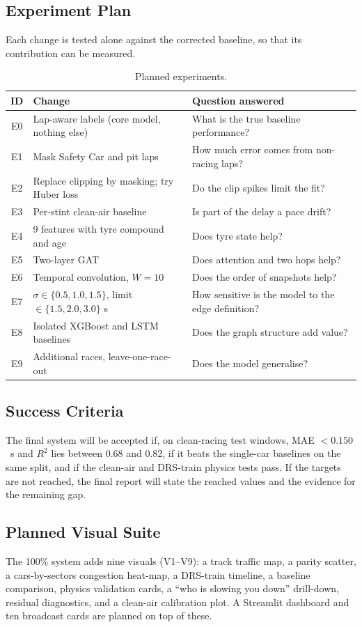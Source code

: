 \documentclass[11pt,a4paper]{article}
\begin{document}
\subsection{Experiment Plan}
Each change is tested alone against the corrected baseline, so that its
contribution can be measured.
\begin{table}[H]
\centering
\caption{Planned experiments.}
\label{tab:experiments}
\small
\begin{tabularx}{\linewidth}{@{}cXX@{}}
\toprule
\textbf{ID} & \textbf{Change} & \textbf{Question answered} \\
\midrule
E0 & Lap-aware labels (core model, nothing else) & What is the true baseline performance? \\
E1 & Mask Safety Car and pit laps & How much error comes from non-racing laps? \\
E2 & Replace clipping by masking; try Huber loss & Do the clip spikes limit the fit? \\
E3 & Per-stint clean-air baseline & Is part of the delay a pace drift? \\
E4 & 9 features with tyre compound and age & Does tyre state help? \\
E5 & Two-layer GAT & Does attention and two hops help? \\
E6 & Temporal convolution, $W=10$ & Does the order of snapshots help? \\
E7 & $\sigma \in \{0.5, 1.0, 1.5\}$, limit $\in \{1.5, 2.0, 3.0\}$ s & How sensitive is the model to the edge definition? \\
E8 & Isolated XGBoost and LSTM baselines & Does the graph structure add value? \\
E9 & Additional races, leave-one-race-out & Does the model generalise? \\
\bottomrule
\end{tabularx}
\end{table}

\subsection{Success Criteria}
The final system will be accepted if, on clean-racing test windows,
MAE $< 0.150$~s and $R^2$ lies between 0.68 and 0.82, if it beats the
single-car baselines on the same split, and if the clean-air and DRS-train
physics tests pass. If the targets are not reached, the final report will
state the reached values and the evidence for the remaining gap.

\subsection{Planned Visual Suite}
The 100\% system adds nine visuals (V1--V9): a track traffic map, a parity
scatter, a cars-by-sectors congestion heat-map, a DRS-train timeline, a
baseline comparison, physics validation cards, a ``who is slowing you down''
drill-down, residual diagnostics, and a clean-air calibration plot. A
Streamlit dashboard and ten broadcast cards are planned on top of these.
\end{document}
